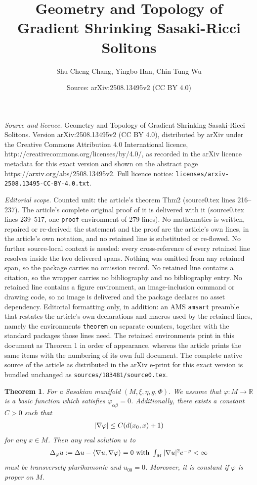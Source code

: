 \documentclass[10pt,a4paper]{amsart}
\title{Geometry and Topology of Gradient Shrinking Sasaki-Ricci Solitons}
\author{Shu-Cheng Chang, Yingbo Han, Chin-Tung Wu}
\date{Source: arXiv:2508.13495v2 (CC BY 4.0)}
\newtheorem{theorem}{Theorem}
\begin{document}
\maketitle

\noindent\emph{Source and licence.} Geometry and Topology of Gradient Shrinking Sasaki-Ricci Solitons. Version arXiv:2508.13495v2 (CC BY 4.0), distributed by arXiv under the Creative Commons Attribution 4.0 International licence, http://creativecommons.org/licenses/by/4.0/, as recorded in the arXiv licence metadata for this exact version and shown on the abstract page https://arxiv.org/abs/2508.13495v2. Full licence notice: \texttt{licenses/arxiv-2508.13495-CC-BY-4.0.txt}.\par\smallskip

\noindent\textit{Editorial scope.} Counted unit: the article's theorem Thm2 (source0.tex lines 216--237). The article's complete original proof of it is delivered with it (source0.tex lines 239--517, one \texttt{proof} environment of 279 lines). No mathematics is written, repaired or re-derived: the statement and the proof are the article's own lines, in the article's own notation, and no retained line is substituted or re-flowed.  No further source-local context is needed: every cross-reference of every retained line resolves inside the two delivered spans.  Nothing was omitted from any retained span, so the package carries no omission record.  No retained line contains a citation, so the wrapper carries no bibliography and no bibliography entry.  No retained line contains a figure environment, an image-inclusion command or drawing code, so no image is delivered and the package declares no asset dependency.  Editorial formatting only, in addition: an AMS \texttt{amsart} preamble that restates the article's own declarations and macros used by the retained lines, namely the environments \texttt{theorem} on separate counters, together with the standard packages those lines need.  The retained environments print in this document as Theorem 1 in order of appearance, whereas the article prints the same items with the numbering of its own full document.  The complete native source of the article as distributed in the arXiv e-print for this exact version is bundled unchanged as \texttt{sources/183481/source0.tex}.
\begin{theorem}
\label{Thm2}For a Sasakian manifold $(M,\xi,\eta,g,\Phi)$. We assume that
$\varphi:M\rightarrow\mathbb{R}$ is a basic function which satisfies
$\varphi_{\alpha\beta}=0$. Additionally, there exists a constant $C>0$ such
that
\[%
\begin{array}
[c]{c}%
|\nabla\varphi|\leq C(d(x_{0},x)+1)
\end{array}
\]
for any $x\in M$. Then any real solution $u$ to
\[%
\begin{array}
[c]{c}%
\Delta_{\varphi}u:=\Delta u-\left\langle \nabla u,\nabla\varphi\right\rangle
=0\text{\ \textrm{with}\ }\int_{M}|\nabla u|^{2}e^{-\varphi}<\infty
\end{array}
\]
must be transversely plurihamonic and $u_{00}=0$. Moreover, it is constant if
$\varphi$ is proper on $M$.
\end{theorem}
\end{document}

